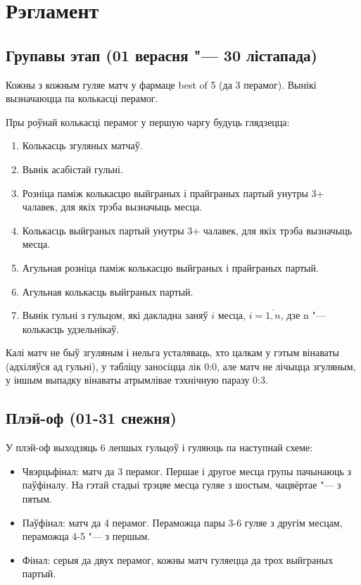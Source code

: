 \documentclass[12pt, a4paper]{extarticle}
\begin{document}
    \section{Рэгламент}
    
    \subsection{Групавы этап (01 верасня "--- 30 лістапада)}

    Кожны з кожным гуляе матч у фармаце best of 5 (да 3 перамог). Вынікі вызначаюцца па колькасці перамог. 
    
    Пры роўнай колькасці перамог у першую чаргу будуць глядзецца:
    \begin{enumerate}
        \item Колькасць згуляных матчаў.
        \item Вынік асабістай гульні.
        \item Розніца паміж колькасцю выйграных і прайграных партый унутры 3+ чалавек, для якіх трэба вызначыць месца.
        \item Колькасць выйграных партый унутры 3+ чалавек, для якіх трэба вызначыць месца.
        \item Агульная розніца паміж колькасцю выйграных і прайграных партый.
        \item Агульная колькасць выйграных партый.
        \item Вынік гульні з гульцом, які дакладна заняў $i$ месца, $i = \overline{1, n}$, дзе n "--- колькасць удзельнікаў.
    \end{enumerate}
    
    Калі матч не быў згуляным і нельга усталяваць, хто цалкам у гэтым вінаваты (адхіляўся ад гульні), у табліцу заносіцца лік 0:0, але матч не лічыцца згуляным, у іншым выпадку вінаваты атрымлівае тэхнічную паразу 0:3.
    
    \subsection{Плэй-оф (01-31 снежня)}
    
    У плэй-оф выходзяць 6 лепшых гульцоў і гуляюць па наступнай схеме:
    
    \begin{itemize}
        \item Чвэрцьфінал: матч да 3 перамог. Першае і другое месца групы пачынаюць з паўфіналу. 
        На гэтай стадыі трэцяе месца гуляе з шостым, чацвёртае "--- з пятым.
        \item Паўфінал: матч да 4 перамог. Пераможца пары 3-6 гуляе з другім месцам, пераможца 4-5 "--- з першым.
        \item Фінал: серыя да двух перамог, кожны матч гуляецца да трох выйграных партый.
    \end{itemize}

    
\end{document}

